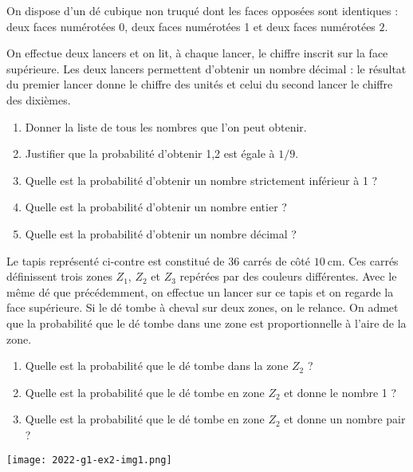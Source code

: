 On dispose d'un dé cubique non truqué dont les faces opposées sont identiques : deux faces numérotées 0, deux faces numérotées 1 et deux faces numérotées $2 .$

\begin{enumerate}
  \item On effectue deux lancers et on lit, à chaque lancer, le chiffre inscrit sur la face supérieure. Les deux lancers permettent d'obtenir un nombre décimal : le résultat du premier lancer donne le chiffre des unités et celui du second lancer le chiffre des dixièmes.
  
  \begin{enumerate}
  	\item Donner la liste de tous les nombres que l'on peut obtenir.
  	\item Justifier que la probabilité d'obtenir 1,2 est égale à $1 / 9$.
  	\item Quelle est la probabilité d'obtenir un nombre strictement inférieur à 1 ?
  	\item Quelle est la probabilité d'obtenir un nombre entier ?
  	\item Quelle est la probabilité d'obtenir un nombre décimal ?
  \end{enumerate}

  \begin{minipage}[t]{.7\linewidth}
  \item 
  
  Le tapis représenté ci-contre est constitué de 36 carrés de côté $10 \mathrm{~cm}$. Ces carrés définissent trois zones $Z_1$, $Z_2$ et $Z_3$ repérées par des couleurs différentes. Avec le même dé que précédemment, on effectue un lancer sur ce tapis et on regarde la face supérieure. Si le dé tombe à cheval sur deux zones, on le relance. On admet que la probabilité que le dé tombe dans une zone est proportionnelle à l'aire de la zone.	
	
	\begin{enumerate}
	\item Quelle est la probabilité que le dé tombe dans la zone $Z_{2}$ ?
	\item Quelle est la probabilité que le dé tombe en zone $Z_{2}$ et donne le nombre 1 ?
	\item Quelle est la probabilité que le dé tombe en zone $Z_{2}$ et donne un nombre pair ?
\end{enumerate}

  \end{minipage}
  \begin{minipage}[t]{.3\linewidth}
    \vspace{0cm}
    \centering
  	\texttt{[image: 2022-g1-ex2-img1.png]}
  \end{minipage}
  
\end{enumerate}